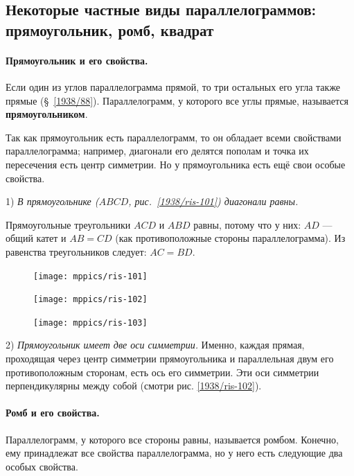 \documentclass[oneside]{book}
\makeatletter
\newcommand{\rindex}[2][\imki@jobname]{%
  \index[#1]{\detokenize{#2}}%
}
\makeatother
\begin{document}
\subsection*{Некоторые частные виды параллелограммов:
прямоугольник, ромб, квадрат}

\paragraph{Прямоугольник и его свойства.}\label{1938/92}
Если один из углов параллелограмма прямой, то три остальных его угла также прямые (§~\ref{1938/88}).
Параллелограмм, у которого все углы прямые, называется \rindex{прямоугольник}\textbf{прямоугольником}.

Так как прямоугольник есть параллелограмм, то он обладает всеми свойствами параллелограмма;
например, диагонали его делятся пополам и точка их пересечения есть центр симметрии.
Но у прямоугольника есть ещё свои особые свойства.

1) \emph{В прямоугольнике \emph{($ABCD$, рис.~\ref{1938/ris-101})} диагонали равны.}

Прямоугольные треугольники $ACD$ и $ABD$ равны, потому что у них:
$AD$ — общий катет и $AB=CD$ (как противоположные стороны параллелограмма).
Из равенства треугольников следует:
$AC = BD$.

\begin{figure}[h!]
\begin{minipage}{.32\textwidth}
\centering
\texttt{[image: mppics/ris-101]}
\caption{}\label{1938/ris-101}
\end{minipage}\hfill
\begin{minipage}{.32\textwidth}
\centering
\texttt{[image: mppics/ris-102]}
\caption{}\label{1938/ris-102}
\end{minipage}\hfill
\begin{minipage}{.32\textwidth}
\centering
\texttt{[image: mppics/ris-103]}
\caption{}\label{1938/ris-103}
\end{minipage}
\end{figure}

2) \emph{Прямоугольник имеет две оси симметрии.}
Именно, каждая прямая, проходящая через центр симметрии прямоугольника и параллельная двум его противоположным сторонам, есть ось его симметрии.
Эти оси симметрии перпендикулярны между собой (смотри рис. \ref{1938/ris-102}). 

\paragraph{Ромб и его свойства.}\label{1938/93}
Параллелограмм, у которого все стороны равны, называется ромбом.
Конечно, ему принадлежат все свойства параллелограмма, но у него есть следующие два особых свойства.
\end{document}
